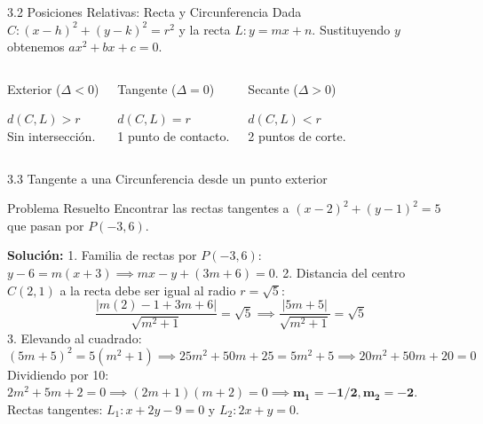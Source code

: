 \documentclass[10pt,aspectratio=169,spanish]{beamer}
\begin{document}
\begin{frame}{3.2 Posiciones Relativas: Recta y Circunferencia}
Dada $C: (x-h)^2 + (y-k)^2 = r^2$ y la recta $L: y = mx + n$. Sustituyendo $y$ obtenemos $ax^2 + bx + c = 0$.

\begin{columns}
  \begin{block}{Exterior ($\Delta < 0$)}
  \begin{center}
  \end{center}
  $d(C,L) > r$\\ Sin intersección.
  \end{block}

  \begin{block}{Tangente ($\Delta = 0$)}
  \begin{center}
  \end{center}
  $d(C,L) = r$\\ 1 punto de contacto.
  \end{block}

  \begin{block}{Secante ($\Delta > 0$)}
  \begin{center}
  \end{center}
  $d(C,L) < r$\\ 2 puntos de corte.
  \end{block}
\end{columns}
\end{frame}

\begin{frame}{3.3 Tangente a una Circunferencia desde un punto exterior}
\begin{exampleblock}{Problema  Resuelto}
Encontrar las rectas tangentes a $(x-2)^2 + (y-1)^2 = 5$ que pasan por $P(-3,6)$.
\end{exampleblock}
\pause
\textbf{Solución:}
1. Familia de rectas por $P(-3,6)$: $y - 6 = m(x + 3) \implies mx - y + (3m + 6) = 0$.
2. Distancia del centro $C(2,1)$ a la recta debe ser igual al radio $r = \sqrt{5}$:
\[
  \frac{|m(2) - 1 + 3m + 6|}{\sqrt{m^2 + 1}} = \sqrt{5} \implies \frac{|5m + 5|}{\sqrt{m^2 + 1}} = \sqrt{5}
\]
3. Elevando al cuadrado:
\[
  (5m + 5)^2 = 5(m^2 + 1) \implies 25m^2 + 50m + 25 = 5m^2 + 5 \implies 20m^2 + 50m + 20 = 0
\]
Dividiendo por 10: $2m^2 + 5m + 2 = 0 \implies (2m+1)(m+2) = 0 \implies \mathbf{m_1 = -1/2}, \mathbf{m_2 = -2}$.
Rectas tangentes: $L_1: x + 2y - 9 = 0$ \quad y \quad $L_2: 2x + y = 0$.
\end{frame}
\end{document}
